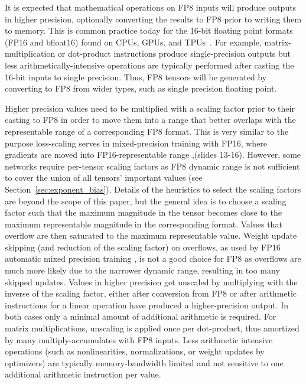 It is expected that mathematical operations on FP8 inputs will produce outputs in higher precision, optionally converting the results to FP8 prior to writing them to memory. This is common practice today for the 16-bit floating point formats (FP16 and bfloat16) found on CPUs, GPUs, and TPUs~\cite{bfloat_arm_2019,mpt2017}. For example, matrix-multiplication or dot-product instructions produce single-precision outputs but less arithmetically-intensive operations are typically performed after casting the 16-bit inputs to single precision. Thus, FP8 tensors will be generated by converting to FP8 from wider types, such as single precision floating point.

Higher precision values need to be multiplied with a scaling factor prior to their casting to FP8 in order to move them into a range that better overlaps with the representable range of a corresponding FP8 format. This is very similar to the purpose loss-scaling serves in mixed-precision training with FP16, where gradients are moved into FP16-representable range \cite{mpt2017},\cite{mpt_2018}(slides 13-16). However, some networks require per-tensor scaling factors as FP8 dynamic range is not sufficient to cover the union of all tensors' important values (see Section~\ref{sec:exponent_bias}). Details of the heuristics to select the scaling factors are beyond the scope of this paper, but the general idea is to choose a scaling factor such that the maximum magnitude in the tensor becomes close to the maximum representable magnitude in the corresponding format. Values that overflow are then saturated to the maximum representable value. Weight update skipping (and reduction of the scaling factor) on overflows, as used by FP16 automatic mixed precision training \cite{mpt_2018}, is not a good choice for FP8 as overflows are much more likely due to the narrower dynamic range, resulting in too many skipped updates. Values in higher precision get unscaled by multiplying with the inverse of the scaling factor, either after conversion from FP8 or after arithmetic instructions for a linear operation have produced a higher-precision output. In both cases only a minimal amount of additional arithmetic is required. For matrix multiplications, unscaling is applied once per dot-product, thus amortized by many multiply-accumulates with FP8 inputs. Less arithmetic intensive operations (such as nonlinearities, normalizations, or weight updates by optimizers) are typically memory-bandwidth limited and not sensitive to one additional arithmetic instruction per value.

